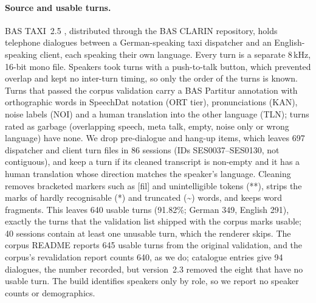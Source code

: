 \paragraph{Source and usable turns.}
BAS TAXI~2.5 \citep{bas2001taxi,reichel2016bas}, distributed through the BAS CLARIN repository, holds telephone dialogues between a German-speaking taxi dispatcher and an English-speaking client, each speaking their own language. Every turn is a separate 8\,kHz, 16-bit mono file. Speakers took turns with a push-to-talk button, which prevented overlap and kept no inter-turn timing, so only the order of the turns is known. Turns that passed the corpus validation carry a BAS Partitur annotation with orthographic words in SpeechDat notation (ORT tier), pronunciations (KAN), noise labels (NOI) and a human translation into the other language (TLN); turns rated as garbage (overlapping speech, meta talk, empty, noise only or wrong language) have none. We drop pre-dialogue and hang-up items, which leaves 697 dispatcher and client turn files in 86 sessions (IDs SES0037--SES0130, not contiguous), and keep a turn if its cleaned transcript is non-empty and it has a human translation whose direction matches the speaker's language. Cleaning removes bracketed markers such as [fil] and unintelligible tokens (**), strips the marks of hardly recognisable (*) and truncated (\textasciitilde) words, and keeps word fragments. This leaves 640 usable turns (91.82\%; German 349, English 291), exactly the turns that the validation list shipped with the corpus marks usable; 40 sessions contain at least one unusable turn, which the renderer skips. The corpus README reports 645 usable turns from the original validation, and the corpus's revalidation report counts 640, as we do; catalogue entries give 94 dialogues, the number recorded, but version~2.3 removed the eight that have no usable turn. The build identifies speakers only by role, so we report no speaker counts or demographics.


